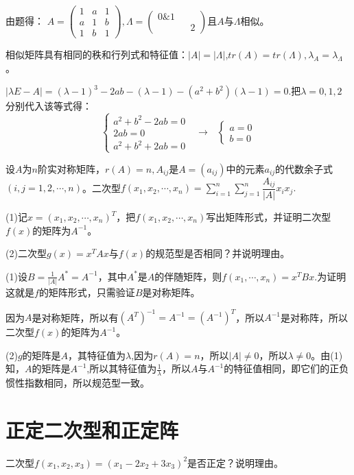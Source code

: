 \documentclass[a4paper]{report}
\begin{document}
\begin{jie}
由题得：
$
A=
\begin{pmatrix}
1&a&1\\
a&1&b\\
1&b&1
\end{pmatrix},\Lambda
=\begin{pmatrix}
0\&1\\&&2
 \end{pmatrix}
$且$A$与$\Lambda$相似。

相似矩阵具有相同的秩和行列式和特征值：$|A|=|\Lambda|$,$tr(A)=tr(\Lambda),\lambda_A=\lambda_{\Lambda}$。

$|\lambda E-A|=(\lambda-1)^3-2ab-(\lambda-1)-(a^2+b^2)(\lambda-1)=0$.把$\lambda=0,1,2$分别代入该等式得：
\begin{equation*}
\begin{cases}
a^2+b^2-2ab=0\\
2ab=0\\
a^2+b^2+2ab=0
\end{cases}~~~\rightarrow~~~
\begin{cases}
a=0\\
b=0
\end{cases}
\end{equation*}
\end{jie}

\EX 设$A$为$n$阶实对称矩阵，$r(A)=n,A_{ij}$是$A=(a_{ij})$中的元素$a_{ij}$的代数余子式$(i,j=1,2,\cdots,n)$。二次型$
f(x_1,x_2,\cdots,x_n)=\sum\limits_{i=1}^{n}\sum\limits_{j=1}^{n}\dfrac{A_{ij}}{|A|}x_ix_j.
$

(1)记$x=(x_1,x_2,\cdots,x_n)^T$，把$f(x_1,x_2,\cdots,x_n)$写出矩阵形式，并证明二次型$f(x)$的矩阵为$A^{-1}$。

(2)二次型$g(x)=x^TAx$与$f(x)$的规范型是否相同？并说明理由。

\begin{zhengming}
(1)设$B=
\frac{1}{|A|}A^*=A^{-1}
$，其中$A^*$是$A$的伴随矩阵，则$f(x_1,\cdots,x_n)=x^TBx$.为证明这就是$f$的矩阵形式，只需验证$B$是对称矩阵。

因为$A$是对称矩阵，所以有$(A^T)^{-1}=A^{-1}=(A^{-1})^T$，所以$A^{-1}$是对称阵，所以二次型$f(x)$的矩阵为$A^{-1}$。

(2)$g$的矩阵是$A$，其特征值为$\lambda$,因为$r(A)=n$，所以$|A|\neq0$，所以$\lambda\neq0$。由(1)知，$A$的矩阵是$A^{-1}$,所以其特征值为$\frac{1}{\lambda}$，所以$A$与$A^{-1}$的特征值相同，即它们的正负惯性指数相同，所以规范型一致。
\end{zhengming}

\clearpage
\section{正定二次型和正定阵}
\EX 二次型$f(x_1,x_2,x_3)=(x_1-2x_2+3x_3)^2$是否正定？说明理由。
\end{document}
